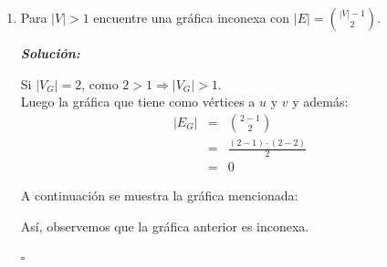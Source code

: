 \documentclass{article}
\begin{document}
\begin{enumerate}
\begin{enumerate}
\begin{proof}
\begin{itemize}
            Nótese que de lo anterior se infiere que $G - \{x\}$ es conexa
            \footnote{Esto ya que $|E_{G - \{x\}}| = {|V_G| \choose 2}$.}
            y así $G + e$ (con $e \in E_G$)
            \begin{eqnarray*}
              |E_{G +e}| &=& {|V| -1 \choose 2} +1\\
              &>& {|V| -1 \choose 2}
            \end{eqnarray*}
            es conexa, pues no hay lazos y no hay aristas múltiples en $G$.

            Entonces, tenemos que la nueva arista está comprendida entre $x$ y algún otro
            vértice en $V_{G - \{x\}}$. Por lo que habrá una $xy$-trayectoria para $y \in E_G$.
        \end{itemize}
        De lo anterior, concluimos que
        $|E_G| > {|V| -1 \choose 2} \Rightarrow G \text{ es conexa.}$ 
      \end{proof}

    \item Para $|V| > 1$ encuentre una gr\'afica inconexa con $|E| = {|V|-1
      \choose 2}$.

      \textbf{\textit{Solución:}}

      Si $|V_G| = 2$, como $2 > 1 \Rightarrow |V_G| > 1$. \\
      Luego la gráfica que tiene como vértices a $u$ y $v$ y además:
      \begin{eqnarray*}
        |E_G| &=& {2 -1 \choose 2}\\
        &=& \frac{(2 -1) \cdot (2 -2)}{2}\\
        &=& 0
      \end{eqnarray*}

      A continuación se muestra la gráfica mencionada:

      \begin{figure}[ht!]
        \centering
      \end{figure}

      Así, observemos que la gráfica anterior es inconexa.

      \hfill $\square$
  \end{enumerate}


\end{enumerate}
\end{document}
